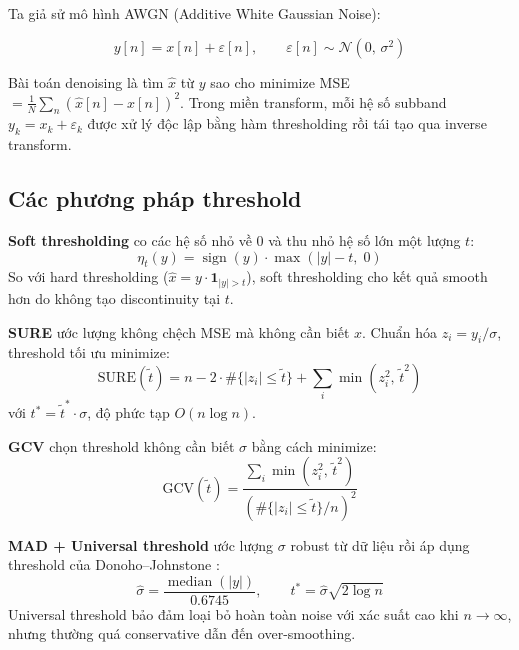 Ta giả sử mô hình AWGN (Additive White Gaussian Noise):

\begin{equation}
    y[n] = x[n] + \varepsilon[n], \qquad \varepsilon[n] \sim \mathcal{N}(0,\, \sigma^2)
\end{equation}

Bài toán denoising là tìm $\hat{x}$ từ $y$ sao cho minimize MSE $= \frac{1}{N}\sum_n(\hat{x}[n]-x[n])^2$. Trong miền transform, mỗi hệ số subband $y_k = x_k + \varepsilon_k$ được xử lý độc lập bằng hàm thresholding rồi tái tạo qua inverse transform.

\subsection{Các phương pháp threshold}

\textbf{Soft thresholding} co các hệ số nhỏ về 0 và thu nhỏ hệ số lớn một lượng $t$:
\begin{equation}
    \eta_t(y) = \operatorname{sign}(y)\cdot\max(|y|-t,\;0)
\end{equation}
So với hard thresholding ($\hat{x} = y\cdot\mathbf{1}_{|y|>t}$), soft thresholding cho kết quả smooth hơn do không tạo discontinuity tại $t$.

\textbf{SURE} \cite{stein1981} ước lượng không chệch MSE mà không cần biết $x$. Chuẩn hóa $z_i = y_i/\sigma$, threshold tối ưu minimize:
\begin{equation}
    \text{SURE}(\tilde{t}) = n - 2\cdot\#\{|z_i|\leq\tilde{t}\} + \sum_i\min(z_i^2,\,\tilde{t}^2)
    \label{eq:sure}
\end{equation}
với $t^* = \tilde{t}^*\cdot\sigma$, độ phức tạp $O(n\log n)$.

\textbf{GCV} \cite{craven1979} chọn threshold không cần biết $\sigma$ bằng cách minimize:
\begin{equation}
    \text{GCV}(\tilde{t}) = \frac{\sum_i\min(z_i^2,\,\tilde{t}^2)}{\left(\#\{|z_i|\leq\tilde{t}\}/n\right)^2}
    \label{eq:gcv}
\end{equation}

\textbf{MAD + Universal threshold} ước lượng $\sigma$ robust từ dữ liệu rồi áp dụng threshold của Donoho--Johnstone \cite{donoho1995}:
\begin{equation}
    \hat{\sigma} = \frac{\operatorname{median}(|y|)}{0.6745}, \qquad t^* = \hat{\sigma}\sqrt{2\log n}
    \label{eq:universal}
\end{equation}
Universal threshold bảo đảm loại bỏ hoàn toàn noise với xác suất cao khi $n\to\infty$, nhưng thường quá conservative dẫn đến over-smoothing.

